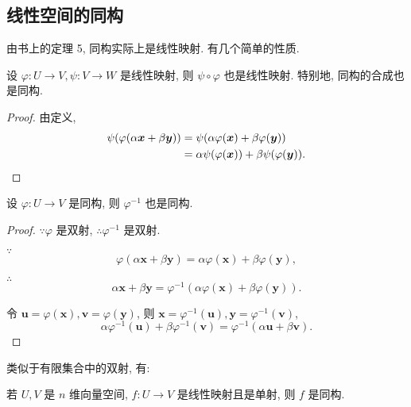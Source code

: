 \documentclass[color=black,device=normal,lang=cn,mode=geye]{elegantnote}
\begin{document}
\subsection{线性空间的同构}
由书上的定理 5, 同构实际上是线性映射. 有几个简单的性质.
\begin{property}
    设 $\varphi:U\to V,\psi:V\to W$ 是线性映射, 则 $\psi\circ\varphi$ 也是线性映射. 特别地, 同构的合成也是同构.
\end{property}
\begin{proof}
    由定义,
    \begin{align*}
        \psi(\varphi(\alpha\boldsymbol{x}+\beta\boldsymbol{y})) & =\psi(\alpha\varphi(\boldsymbol{x})+\beta\varphi(\boldsymbol{y})) \\
        & =\alpha\psi(\varphi(\boldsymbol{x}))+\beta\psi(\varphi(\boldsymbol{y})).\qedhere
    \end{align*}
\end{proof}
\begin{property}
    设 $\varphi:U\to V$ 是同构, 则 $\varphi^{-1}$ 也是同构.
\end{property}
\begin{proof}
    $\because\varphi$ 是双射, $\therefore\varphi^{-1}$ 是双射.

    $\because$
    \[\varphi(\alpha\boldsymbol{x}+\beta\boldsymbol{y})=\alpha\varphi(\boldsymbol{x})+\beta\varphi(\boldsymbol{y}),\]

    $\therefore$
    \[\alpha\boldsymbol{x}+\beta\boldsymbol{y}=\varphi^{-1}(\alpha\varphi(\boldsymbol{x})+\beta\varphi(\boldsymbol{y})).\]

    令 $\boldsymbol{u}=\varphi(\boldsymbol{x}),\boldsymbol{v}=\varphi(\boldsymbol{y})$, 则 $\boldsymbol{x}=\varphi^{-1}(\boldsymbol{u}),\boldsymbol{y}=\varphi^{-1}(\boldsymbol{v})$,
    \[\alpha\varphi^{-1}(\boldsymbol{u})+\beta\varphi^{-1}(\boldsymbol{v})=\varphi^{-1}(\alpha\boldsymbol{u}+\beta\boldsymbol{v}).\]
\end{proof}
类似于有限集合中的双射, 有:
\begin{theorem}\label{t1.5}
    若 $U,V$ 是 $n$ 维向量空间, $f:U\to V$ 是线性映射且是单射, 则 $f$ 是同构.
\end{theorem}
\end{document}
